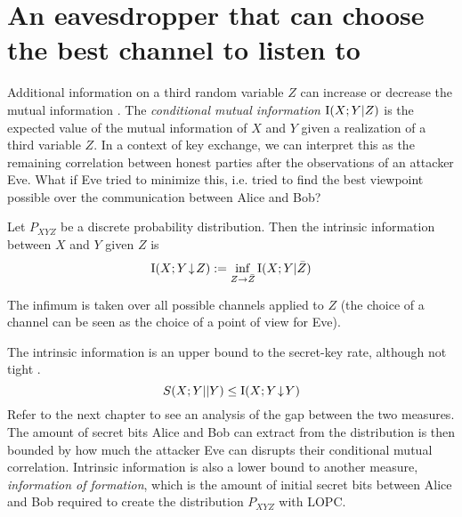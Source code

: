 \section{An eavesdropper that can choose the best channel to listen to}
Additional information on a third random variable $Z$ can increase or decrease the mutual information \cite{CT12}.
    The \emph{conditional mutual information} $\operatorname{I}(X;Y|Z)$ is the expected value of the mutual information of $X$ and $Y$ given a realization of a third variable $Z$.
    In a context of key exchange, we can interpret this as the remaining correlation between honest parties after the observations of an attacker Eve.
    What if Eve tried to minimize this, i.e. tried to find the best viewpoint possible over the communication between Alice and Bob?
    \begin{definition}\cite{MW99, RW03}
    	Let $P_{XYZ}$ be a discrete probability distribution. Then the intrinsic information between $X$ and $Y$ given $Z$ is
    \begin{equation} \label{intrininfo}
    	\operatorname{I}(X;Y\!\downarrow\!Z):= \inf_{Z\rightarrow \bar{Z}} \operatorname{I}(X;Y | \bar{Z})
    \end{equation}
    \end{definition}
    The infimum is taken over all possible channels applied to $Z$ (the choice of a channel can be seen as the choice of a point of view for Eve).
    
    The intrinsic information is an upper bound to the secret-key rate, although not tight \cite{RW03}. 
    \begin{equation} \label{eq:bkeyinfo}
    	S(X;Y||Y) \leq \operatorname{I}(X;Y\!\downarrow\!Y)
    \end{equation}
    Refer to the next chapter to see an analysis of the gap between the two measures.
    The amount of secret bits Alice and Bob can extract from the distribution is then bounded by how much the attacker Eve can disrupts their conditional mutual correlation.
    Intrinsic information is also a lower bound to another measure, \emph{information of formation}, which is the amount of initial secret bits between Alice and Bob required to create the distribution $P_{XYZ}$ with LOPC.
    
   
